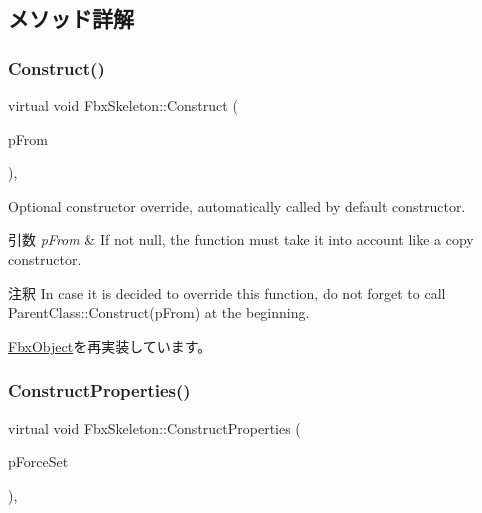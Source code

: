 \subsection{メソッド詳解}
\mbox{\label{class_fbx_skeleton_a76c2cdc12c50e753bf2510aa9c18c594}} 
\subsubsection{\texorpdfstring{Construct()}{Construct()}}
{\footnotesize\ttfamily virtual void Fbx\+Skeleton\+::\+Construct (\begin{DoxyParamCaption}\item[{const \hyperlink{class_fbx_object}{Fbx\+Object} $\ast$}]{p\+From }\end{DoxyParamCaption})\hspace{0.3cm}{\ttfamily [protected]}, {\ttfamily [virtual]}}

Optional constructor override, automatically called by default constructor. 
\begin{DoxyParams}{引数}
{\em p\+From} & If not null, the function must take it into account like a copy constructor. \\
\hline
\end{DoxyParams}
\begin{DoxyRemark}{注釈}
In case it is decided to override this function, do not forget to call Parent\+Class\+::\+Construct(p\+From) at the beginning. 
\end{DoxyRemark}


\hyperlink{class_fbx_object_a313503bc645af3fdceb4a99ef5cea7eb}{Fbx\+Object}を再実装しています。

\mbox{\label{class_fbx_skeleton_aa1e8d4dbe577415b4e00914ae75d46a0}} 
\subsubsection{\texorpdfstring{Construct\+Properties()}{ConstructProperties()}}
{\footnotesize\ttfamily virtual void Fbx\+Skeleton\+::\+Construct\+Properties (\begin{DoxyParamCaption}\item[{bool}]{p\+Force\+Set }\end{DoxyParamCaption})\hspace{0.3cm}{\ttfamily [protected]}, {\ttfamily [virtual]}}

